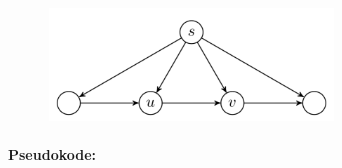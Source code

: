 \documentclass[12pt]{report}
\begin{document}

\begin{figure}[H]
	\begin{Center}
		\includegraphics[width=2.99in,height=1.18in]{./media/image131.png}
	\end{Center}
\end{figure}



\paragraph*{ }

\vspace{\baselineskip}
\paragraph*{Pseudokode:}
\end{document}
